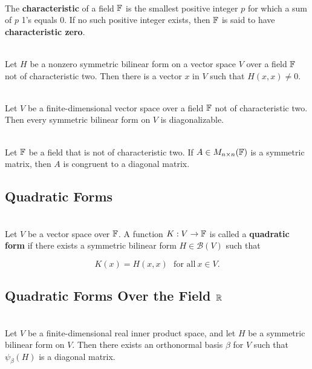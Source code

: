 \begin{definition}
	\hfill\\
	The \textbf{characteristic} of a field $\mathbb{F}$ is the smallest positive integer $p$ for which a sum of $p$ 1's equals $0$. If no such positive integer exists, then $\mathbb{F}$ is said to have \textbf{characteristic zero}.
\end{definition}

\begin{lemma}
	\hfill\\
	Let $H$ be a nonzero symmetric bilinear form on a vector space $V$ over a field $\mathbb{F}$ not of characteristic two. Then there is a vector $x$ in $V$ such that $H(x,x) \neq 0$.
\end{lemma}

\begin{theorem}
	\hfill\\
	Let $V$ be a finite-dimensional vector space over a field $\mathbb{F}$ not of characteristic two. Then every symmetric bilinear form on $V$ is diagonalizable.
\end{theorem}

\begin{corollary}
	\hfill\\
	Let $\mathbb{F}$ be a field that is not of characteristic two. If $A \in M_{n \times n}(\mathbb{F})$ is a symmetric matrix, then $A$ is congruent to a diagonal matrix.
\end{corollary}

\subsection*{Quadratic Forms}

\begin{definition}
	\hfill\\
	Let $V$ be a vector space over $\mathbb{F}$. A function $K: V \to \mathbb{F}$ is called a \textbf{quadratic form} if there exists a symmetric bilinear form $H \in \mathcal{B}(V)$ such that

	\[K(x) = H(x, x)\ \ \ \text{for all}\ x \in V.\]
\end{definition}

\subsection*{Quadratic Forms Over the Field $\mathbb{R}$}

\begin{theorem}
	\hfill\\
	Let $V$ be a finite-dimensional real inner product space, and let $H$ be a symmetric bilinear form on $V$. Then there exists an orthonormal basis $\beta$ for $V$ such that $\psi_\beta(H)$ is a diagonal matrix.
\end{theorem}

